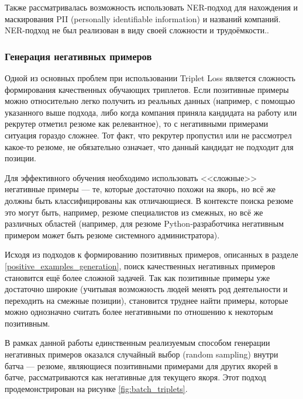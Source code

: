 \documentclass[14pt]{mmcs_article}
\begin{document}
Также рассматривалась возможность использовать NER-подход для нахождения и маскирования PII (personally identifiable information) и названий компаний. NER-подход не был реализован в виду своей сложности и трудоёмкости..

\subsubsection{Генерация негативных примеров}

Одной из основных проблем при использовании Triplet Loss является сложность формирования качественных обучающих триплетов. Если позитивные примеры можно относительно легко получить из реальных данных (например, с помощью указанного выше подхода, либо когда компания приняла кандидата на работу или рекрутер отметил резюме как релевантное), то с негативными примерами ситуация гораздо сложнее. Тот факт, что рекрутер пропустил или не рассмотрел какое-то резюме, не обязательно означает, что данный кандидат не подходит для позиции.

Для эффективного обучения необходимо использовать <<сложные>> негативные примеры --- те, которые достаточно похожи на якорь, но всё же должны быть классифицированы как отличающиеся. В контексте поиска резюме это могут быть, например, резюме специалистов из смежных, но всё же различных областей (например, для резюме Python-разработчика негативным примером может быть резюме системного администратора).

Исходя из подходов к формированию позитивных примеров, описанных в разделе \ref{positive_examples_generation}, поиск качественных негативных примеров становится ещё более сложной задачей. Так как позитивные примеры уже достаточно широкие (учитывая возможность людей менять род деятельности и переходить на смежные позиции), становится труднее найти примеры, которые можно однозначно считать более негативными по отношению к некоторым позитивным.

В рамках данной работы единственным реализуемым способом генерации негативных примеров оказался случайный выбор (random sampling) внутри батча --- резюме, являющиеся позитивными примерами для других якорей в батче, рассматриваются как негативные для текущего якоря. Этот подход продемонстрирован на рисунке \ref{fig:batch_triplets}.
\end{document}
